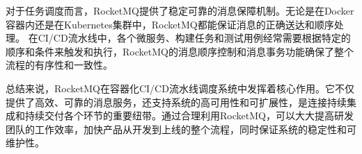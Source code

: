 对于任务调度而言，RocketMQ提供了稳定可靠的消息保障机制。无论是在Docker容器内还是在Kubernetes集群中，RocketMQ都能保证消息的正确送达和顺序处理。
在CI/CD流水线中，各个微服务、构建任务和测试用例经常需要根据特定的顺序和条件来触发和执行，RocketMQ的消息顺序控制和消息事务功能确保了整个流程的有序性和一致性\cite{1018841702.nh}。

总结来说，RocketMQ在容器化CI/CD流水线调度系统中发挥着核心作用。它不仅提供了高效、可靠的消息服务，还支持系统的高可用性和可扩展性，是连接持续集成和持续交付各个环节的重要纽带。通过合理利用RocketMQ，可以大大提高研发团队的工作效率，加快产品从开发到上线的整个流程，同时保证系统的稳定性和可维护性。


